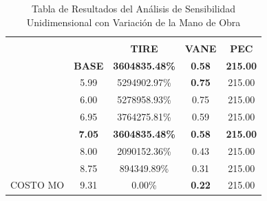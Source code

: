 \documentclass[a4paper,openright,12pt]{book}
\begin{document}
\begin{table}[H]
\begin{tabular}{ccccc}
\multicolumn{1}{l}{}                               & \multicolumn{1}{l}{}              & \multicolumn{3}{c}{\cellcolor[HTML]{1D6194}{\color[HTML]{FFFFFF} \textbf{RESULTADOS}}}                               \\
\multicolumn{1}{l}{}                               & \cellcolor[HTML]{D9D9D9}\textbf{} & \cellcolor[HTML]{D9D9D9}\textbf{TIRE} & \cellcolor[HTML]{D9D9D9}\textbf{VANE} & \cellcolor[HTML]{D9D9D9}\textbf{PEC} \\
\cellcolor[HTML]{75BDA7}                           & \textbf{BASE}                     & \textbf{3604835.48\%}                 & \textbf{0.58}                         & \textbf{215.00}                      \\
\cellcolor[HTML]{75BDA7}                           & \cellcolor[HTML]{FFFF00}5.99      & 5294902.97\%                          & \textbf{0.75}                         & 215.00                               \\
\cellcolor[HTML]{75BDA7}                           & 6.00                              & 5278958.93\%                          & 0.75                                  & 215.00                               \\
\cellcolor[HTML]{75BDA7}                           & 6.95                              & 3764275.81\%                          & 0.59                                  & 215.00                               \\
\rowcolor[HTML]{ABD8CA} 
\cellcolor[HTML]{75BDA7}                           & \textbf{7.05}                     & \textbf{3604835.48\%}                 & \textbf{0.58}                         & \textbf{215.00}                      \\
\cellcolor[HTML]{75BDA7}                           & 8.00                              & 2090152.36\%                          & 0.43                                  & 215.00                               \\
\cellcolor[HTML]{75BDA7}                           & 8.75                              & 894349.89\%                           & 0.31                                  & 215.00                               \\
\multirow{-8}{*}{\cellcolor[HTML]{75BDA7}COSTO MO} & \cellcolor[HTML]{FFFF00}9.31      & 0.00\%                                & \textbf{0.22}                         & 215.00                              
\end{tabular}
\caption{Tabla de Resultados del Análisis de Sensibilidad Unidimensional con Variación de la Mano de Obra}
\label{Tabla22}
\end{table}
\end{document}

